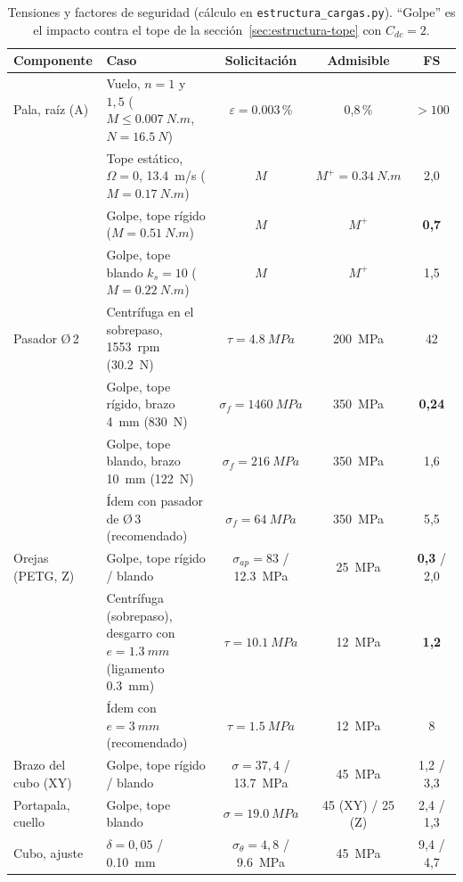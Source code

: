 \begin{table}[tp]
\centering\footnotesize
\caption{Tensiones y factores de seguridad (cálculo en \texttt{estructura\_cargas.py}).
``Golpe'' es el impacto contra el tope de la sección~\ref{sec:estructura-tope} con
$C_{dc}=2$.}\label{tab:estructura-fs}
\begin{tabularx}{\textwidth}{@{}lYccc@{}}
\toprule
\textbf{Componente} & \textbf{Caso} & \textbf{Solicitación} & \textbf{Admisible} & \textbf{FS}\\\midrule
Pala, raíz (A) & Vuelo, $n=1$ y $1{,}5$ ($M\le\SI{0.007}{N.m}$, $N=\SI{16.5}{N}$) & $\varepsilon=\num{0.003}$\,\% & 0,8\,\% & $>100$\\
               & Tope estático, $\Omega=0$, \SI{13.4}{m/s} ($M=\SI{0.17}{N.m}$) & $M$ & $M^+=\SI{0.34}{N.m}$ & 2,0\\
               & Golpe, tope rígido ($M=\SI{0.51}{N.m}$) & $M$ & $M^+$ & \textbf{0,7}\\
               & Golpe, tope blando $k_s=10$ ($M=\SI{0.22}{N.m}$) & $M$ & $M^+$ & 1,5\\
Pasador Ø\,2 & Centrífuga en el sobrepaso, \num{1553}~rpm (\SI{30.2}{N}) & $\tau=\SI{4.8}{MPa}$ & \SI{200}{MPa} & 42\\
             & Golpe, tope rígido, brazo \SI{4}{mm} (\SI{830}{N}) & $\sigma_f=\SI{1460}{MPa}$ & \SI{350}{MPa} & \textbf{0,24}\\
             & Golpe, tope blando, brazo \SI{10}{mm} (\SI{122}{N}) & $\sigma_f=\SI{216}{MPa}$ & \SI{350}{MPa} & 1,6\\
             & Ídem con pasador de Ø\,3 (recomendado) & $\sigma_f=\SI{64}{MPa}$ & \SI{350}{MPa} & 5,5\\
Orejas (PETG, Z) & Golpe, tope rígido / blando & $\sigma_{ap}=83$ / \SI{12.3}{MPa} & \SI{25}{MPa} & \textbf{0,3} / 2,0\\
                 & Centrífuga (sobrepaso), desgarro con $e=\SI{1.3}{mm}$ (ligamento \SI{0.3}{mm}) & $\tau=\SI{10.1}{MPa}$ & \SI{12}{MPa} & \textbf{1,2}\\
                 & Ídem con $e=\SI{3}{mm}$ (recomendado) & $\tau=\SI{1.5}{MPa}$ & \SI{12}{MPa} & 8\\
Brazo del cubo (XY) & Golpe, tope rígido / blando & $\sigma=37{,}4$ / \SI{13.7}{MPa} & \SI{45}{MPa} & 1,2 / 3,3\\
Portapala, cuello & Golpe, tope blando & $\sigma=\SI{19.0}{MPa}$ & 45 (XY) / 25 (Z) & 2,4 / 1,3\\
Cubo, ajuste & $\delta=0{,}05$ / \SI{0.10}{mm} & $\sigma_\theta=4{,}8$ / \SI{9.6}{MPa} & \SI{45}{MPa} & 9,4 / 4,7\\

\end{tabularx}
\end{table}
